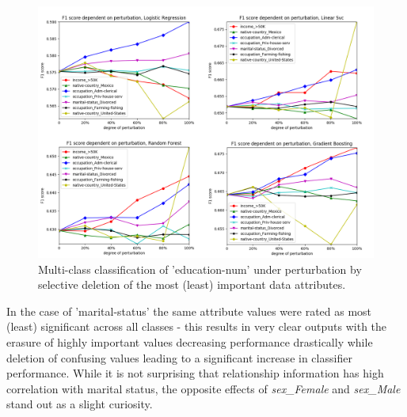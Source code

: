 \documentclass{llncs}
\begin{document}
\begin{figure}[!h]
	\centering
	\includegraphics[width=1\textwidth]{figures/perturbation/adults_education_num/perturb_education_combined}
	\caption{Multi-class classification of 'education-num' under perturbation by selective deletion of the most (least) important data attributes.}
	\label{fig:results_perturbation_education_num}
\end{figure}


In the case of 'marital-status' the same attribute values were rated as most (least) significant across all classes - this results in very clear outputs with the erasure of highly important values decreasing performance drastically while deletion of confusing values leading to a significant increase in classifier performance. While it is not surprising that relationship information has high correlation with marital status, the opposite effects of \textit{sex\_Female} and \textit{sex\_Male} stand out as a slight curiosity.
\end{document}
